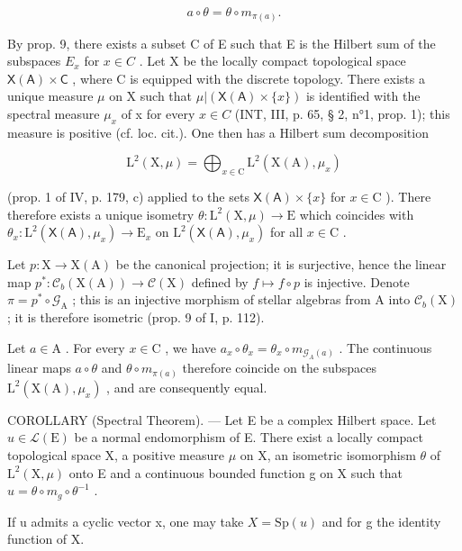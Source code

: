 \[
a \circ \theta = \theta \circ m _ {\pi (a)}.
\]

By prop. 9, there exists a subset C of E such that E is the Hilbert sum of the subspaces \(E_{x}\) for \(x \in C\) . Let X be the locally compact topological space \(\mathsf{X}(\mathsf{A}) \times \mathsf{C}\) , where C is equipped with the discrete topology. There exists a unique measure \(\mu\) on X such that \(\mu|(\mathsf{X}(\mathsf{A}) \times \{x\})\) is identified with the spectral measure \(\mu_{x}\) of x for every \(x \in C\) (INT, III, p. 65, § 2, n°1, prop. 1); this measure is positive (cf. loc. cit.). One then has a Hilbert sum decomposition

\[
\mathrm{L} ^ {2} (\mathrm{X}, \mu) = \bigoplus_ {x \in \mathrm{C}} \mathrm{L} ^ {2} (\mathrm{X} (\mathrm{A}), \mu_ {x})
\]

(prop. 1 of IV, p. 179, c) applied to the sets \(\mathsf{X}(\mathsf{A}) \times \{x\}\) for \(x \in \mathrm{C}\) ). There therefore exists a unique isometry \(\theta: \mathrm{L}^2(\mathrm{X}, \mu) \to \mathrm{E}\) which coincides with \(\theta_x: \mathrm{L}^2(\mathsf{X}(\mathsf{A}), \mu_x) \to \mathrm{E}_x\) on \(\mathrm{L}^2(\mathsf{X}(\mathsf{A}), \mu_x)\) for all \(x \in \mathrm{C}\) .

Let \(p \colon \mathrm{X} \to \mathrm{X}(\mathrm{A})\) be the canonical projection; it is surjective, hence the linear map \(p^* \colon \mathcal{C}_b(\mathrm{X}(\mathrm{A})) \to \mathcal{C}(\mathrm{X})\) defined by \(f \mapsto f \circ p\) is injective. Denote \(\pi = p^* \circ \mathcal{G}_{\mathrm{A}}\) ; this is an injective morphism of stellar algebras from A into \(\mathcal{C}_b(\mathrm{X})\) ; it is therefore isometric (prop. 9 of I, p. 112).

Let \(a \in \mathrm{A}\) . For every \(x \in \mathrm{C}\) , we have \(a_x \circ \theta_x = \theta_x \circ m_{\mathcal{G}_A(a)}\) . The continuous linear maps \(a \circ \theta\) and \(\theta \circ m_{\pi(a)}\) therefore coincide on the subspaces \(\mathrm{L}^2(\mathrm{X}(\mathrm{A}), \mu_x)\) , and are consequently equal.

COROLLARY (Spectral Theorem). --- Let E be a complex Hilbert space. Let \(u \in \mathcal{L}(\mathrm{E})\) be a normal endomorphism of E. There exist a locally compact topological space X, a positive measure \(\mu\) on X, an isometric isomorphism \(\theta\) of \(\mathrm{L}^{2}(\mathrm{X},\mu)\) onto E and a continuous bounded function g on X such that \(u = \theta \circ m_{g} \circ \theta^{-1}\) .

If u admits a cyclic vector x, one may take \(X = \mathrm{Sp}(u)\) and for g the identity function of X.

